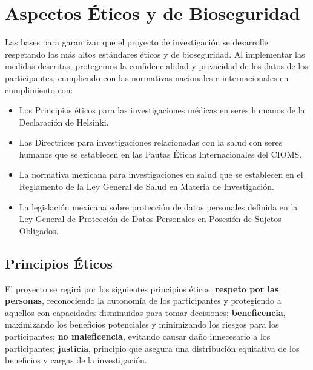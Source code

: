 \section{Aspectos Éticos y de Bioseguridad}
\label{sec:aspectos_eticos_bioseguridad}

Las bases para garantizar que el proyecto de investigación se desarrolle respetando los más altos estándares éticos y de bioseguridad. Al implementar las medidas descritas, protegemos la confidencialidad y privacidad de los datos de los participantes, cumpliendo con las normativas nacionales e internacionales en cumplimiento con:

\begin{itemize}
    \item Los Principios éticos para las investigaciones médicas en seres humanos de la Declaración de Helsinki.
    
    \item Las Directrices para investigaciones relacionadas con la salud con seres humanos que se establecen en las Pautas Éticas Internacionales del CIOMS.
    
    \item La normativa mexicana para investigaciones en salud que se establecen en el Reglamento de la Ley General de Salud en Materia de Investigación.
    
    \item La legislación mexicana sobre protección de datos personales definida en la Ley General de Protección de Datos Personales en Posesión de Sujetos Obligados.
\end{itemize}

\subsection{Principios Éticos}
\label{subsec:principios_eticos}

El proyecto se regirá por los siguientes principios éticos: \textbf{respeto por las personas}, reconociendo la autonomía de los participantes y protegiendo a aquellos con capacidades disminuidas para tomar decisiones; \textbf{beneficencia}, maximizando los beneficios potenciales y minimizando los riesgos para los participantes; \textbf{no maleficencia}, evitando causar daño innecesario a los participantes; \textbf{justicia}, principio que asegura una distribución equitativa de los beneficios y cargas de la investigación.

